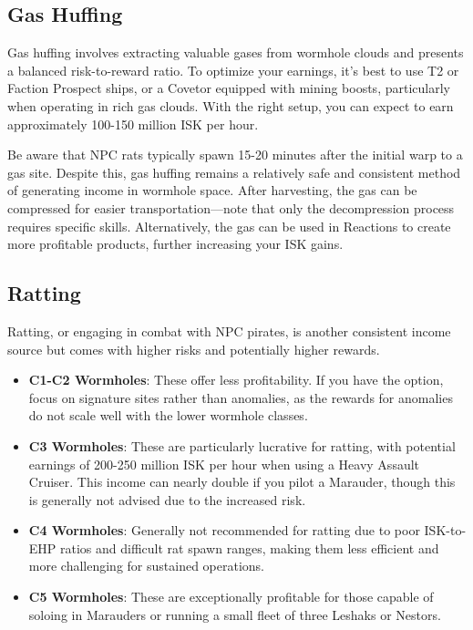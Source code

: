 \documentclass[a4paper,12pt]{report}
\begin{document}
\subsection{Gas Huffing}

Gas huffing involves extracting valuable gases from wormhole clouds and presents a balanced risk-to-reward ratio. To optimize your earnings, it's best to use T2 or Faction Prospect ships, or a Covetor equipped with mining boosts, particularly when operating in rich gas clouds. With the right setup, you can expect to earn approximately 100-150 million ISK per hour.

Be aware that NPC rats typically spawn 15-20 minutes after the initial warp to a gas site. Despite this, gas huffing remains a relatively safe and consistent method of generating income in wormhole space. After harvesting, the gas can be compressed for easier transportation—note that only the decompression process requires specific skills. Alternatively, the gas can be used in Reactions to create more profitable products, further increasing your ISK gains.

\subsection{Ratting}

Ratting, or engaging in combat with NPC pirates, is another consistent income source but comes with higher risks and potentially higher rewards.

\begin{itemize}
    \item \textbf{C1-C2 Wormholes}: These offer less profitability. If you have the option, focus on signature sites rather than anomalies, as the rewards for anomalies do not scale well with the lower wormhole classes.
    \item \textbf{C3 Wormholes}: These are particularly lucrative for ratting, with potential earnings of 200-250 million ISK per hour when using a Heavy Assault Cruiser. This income can nearly double if you pilot a Marauder, though this is generally not advised due to the increased risk.
    \item \textbf{C4 Wormholes}: Generally not recommended for ratting due to poor ISK-to-EHP ratios and difficult rat spawn ranges, making them less efficient and more challenging for sustained operations.
    \item \textbf{C5 Wormholes}: These are exceptionally profitable for those capable of soloing in Marauders or running a small fleet of three Leshaks or Nestors.
\end{itemize}
\end{document}
